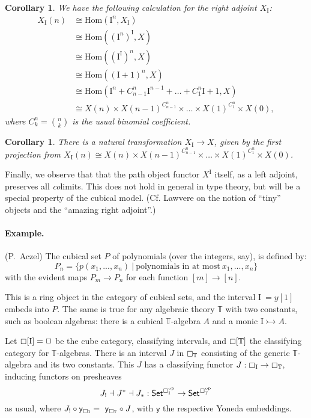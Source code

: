\documentclass[12pt]{article}
\newcommand{\C}{\ensuremath{\boxempty}}
\newcommand{\T}{\ensuremath{\mathbb{T}}}
\newcommand{\psh}[1]{\ensuremath{\mathsf{Set}^{#1^{\mathrm{op}}}}}
\newcommand{\y}{\ensuremath{\mathsf{y}}} %
\renewcommand{\hom}{\ensuremath{\mathrm{Hom}}}
\newcommand{\mono}{\ensuremath{\rightarrowtail}}
\renewcommand{\to}{\ensuremath{\rightarrow}}
\newcommand{\I}{\ensuremath{\mathrm{I}}}
\renewcommand{\H}{\ensuremath{\Box}}
\newtheorem{corollary}[theorem]{Corollary}
\theoremstyle{remark}
\theoremstyle{definition}
\begin{document}
\begin{corollary}
We have the following calculation for the right adjoint $X_\I$:
\begin{align*}
X_\I(n) &\cong \hom(\I^n, X_\I) \\
&\cong \hom((\I^n)^\I, X) \\
&\cong \hom((\I^\I)^n, X) \\
&\cong \hom((\I+1)^n, X) \\
&\cong \hom(\I^n + C^n_{n-1}\I^{n-1} + \dots + C^n_{1}\I+1, X) \\
&\cong X(n) \times X(n-1)^{C^n_{n-1}} \times \dots \times X(1)^{C^n_{1}}\times X(0),
\end{align*}
where $C^n_{k} = \binom{n}{k}$ is the usual binomial coefficient.
\end{corollary}

\begin{corollary}
There is a natural transformation $X_\I \to X$, given by the first projection from $X_\I(n)\cong X(n) \times X(n-1)^{C^n_{n-1}} \times \dots \times X(1)^{C^n_{1}}\times X(0)$.
\end{corollary}

Finally, we observe that that the path object functor $X^\I$ itself, as a left adjoint, preserves all \emph{co}limits.  This does not hold in general in type theory, but will be a special property of the cubical model.  (Cf. Lawvere \cite{ATOM} on the notion of ``tiny'' objects and the ``amazing right adjoint''.)  

\paragraph{Example.} (P.~Aczel)
The cubical set $P$ of polynomials (over the integers, say), is defined by:
\[
P_n = \{ p(x_1, ...,  x_n)\ |\  \text{polynomials in at most}\  x_1, ..., x_n \}
\]
with the evident maps $P_m \to P_n$ for each function $[m] \to [n]$.

This is a ring object in the category of cubical sets, and the interval $\I\ = y[1]$ embeds into $P$.
The same is true for any algebraic theory $\T$ with two constants, such as boolean algebras: there is a cubical $\T$-algebra $A$ and a monic $\I \mono A$.

Let $\C[\I] = \H$ be the cube category, classifying intervals, and $\C[\T]$ the classifying category for $\T$-algebras.  There is an interval $J$ in $\C_\T$  consisting of the generic $\T$-algebra and its two constants.  This $J$ has a classifying functor $J : \C_\I \to \C_\T$, inducing functors on presheaves
\[
J_! \dashv J^* \dashv J_* : \psh{\C_\I} \to \psh{\C_\T}
\]
as usual, where $J_! \circ \y_{\C_\I} =\ \y_{\C_\T} \circ J$,  with $\y$ the respective Yoneda embeddings.
\end{document}
